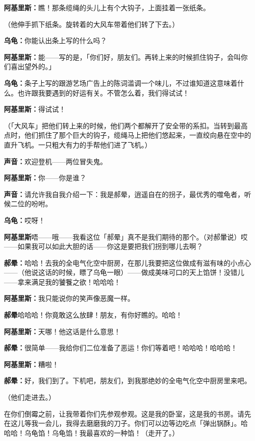 \documentclass[
  12pt,
  twoside,
  openright,
  oldfontcommands,
]{memoir}
\newcommand{\kaitismall}[1]{{\kaitifamily\small #1}}
\newcommand{\dialogname}[1]{{\heifamily\bfseries #1}}
\begin{document}
\dialogname{阿基里斯：}瞧！那条缆绳的头儿上有个大钩子，上面挂着一张纸条。

（他伸手抓下纸条。旋转着的大风车带着他们转了下去。）

\dialogname{乌龟：}你能认出条上写的什么吗？

\dialogname{阿基里斯：}能------写的是，「你们好，朋友们。再转上来的时候抓住钩子，会叫你们喜出望外的。」

\dialogname{乌龟：}条子上写的跟游艺场广告上的陈词滥调一个味儿，不过谁知道这意味着什么。也许跟我要遇到的好运有关。不管怎么着，我们得试试！

\dialogname{阿基里斯：}得试试！

（「大风车」把他们转上来的时候，他们两个都解开了安全带的系扣。当转到最高点时，他们抓住了那个巨大的钩子，缆绳马上把他们悠起来，一直绞向悬在空中的直升飞机。一只粗大有力的手帮他们进了飞机。）

\dialogname{声音：}欢迎登机------两位冒失鬼。

\dialogname{阿基里斯：}你------你是谁？

\dialogname{声音：}请允许我自我介绍一下：我是郝晕，逍遥自在的拐子，最优秀的噬龟者，听候二位的吩咐。

\dialogname{乌龟：}哎呀！

\dialogname{阿基里斯}唔------哦------我看这位「郝晕」真不是我们期待的那个。\kaitismall{（对郝暈说）}哎------如果我可以如此大胆的话------你这是要把我们拐到哪儿去啊？

\dialogname{郝晕：}哈哈！去我的全电气化空中厨房，在那儿我要把这位做成有滋有味的小点心------\kaitismall{（他说这话的时候，瞟了乌龟一眼）}------做成美味可口的天上馅饼！没错儿------拿来满足我的饕餮之欲！哈哈哈！

\dialogname{阿基里斯：}我只能说你的笑声像恶魔一样。

\dialogname{郝晕}哈哈哈！你竟敢这么放肆！朋友，有你好瞧的。哈哈！

\dialogname{阿基里斯：}天哪！他这话是什么意思！

\dialogname{郝晕：}很简单------我给你们二位准备了恶运！你们等着吧！哈哈哈！哈哈哈！

\dialogname{阿基里斯：}糟啦！

\dialogname{郝晕：}好，我们到了。下机吧，朋友们，到我那绝妙的全电气化空中厨房里来吧。

（他们走进去。）

在你们倒霉之前，让我带着你们先参观参观。这是我的卧室，这是我的书房。请先在这儿等我一会儿，我得去磨磨我的刀子。你们可以边等边吃点「弹出锅酥」。哈哈哈！乌龟馅！乌龟馅！我最喜欢的一种馅！\kaitismall{（走开了。）}
\end{document}
